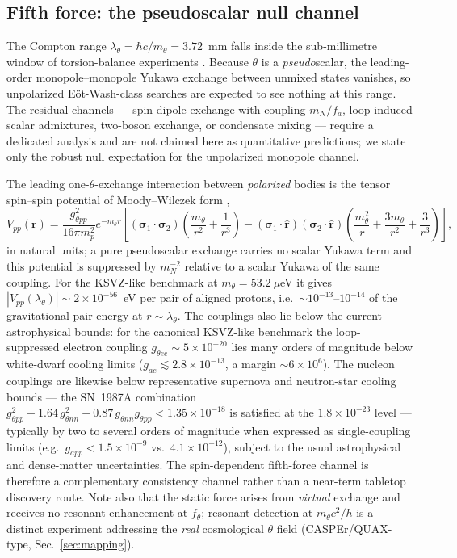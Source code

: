 \documentclass[11pt,a4paper]{article}
\begin{document}
\subsection{Fifth force: the pseudoscalar null channel}

The Compton range $\lambda_\theta = \hbar c/m_\theta = 3.72$~mm falls inside
the sub-millimetre window of torsion-balance experiments \cite{AxionReview}.
Because $\theta$ is a \emph{pseudo}scalar, the leading-order
monopole--monopole Yukawa exchange between unmixed states vanishes, so
unpolarized E\"ot-Wash-class searches are expected to see nothing at this
range. The residual channels --- spin-dipole exchange with coupling
$m_N/f_a$, loop-induced scalar admixtures, two-boson exchange, or
condensate mixing --- require a dedicated analysis and are not claimed here
as quantitative predictions; we state only the robust null expectation for
the unpolarized monopole channel.

The leading one-$\theta$-exchange interaction between \emph{polarized}
bodies is the tensor spin--spin potential of Moody--Wilczek form
\cite{MoodyWilczek},
\begin{equation}
V_{pp}(\mathbf r) = \frac{g_{\theta pp}^{2}}{16\pi m_p^{2}}
e^{-m_\theta r}
\left[
(\boldsymbol\sigma_1\cdot\boldsymbol\sigma_2)
\left(\frac{m_\theta}{r^2}+\frac{1}{r^3}\right)
-
(\boldsymbol\sigma_1\cdot\hat{\mathbf r})
(\boldsymbol\sigma_2\cdot\hat{\mathbf r})
\left(
\frac{m_\theta^2}{r}+\frac{3m_\theta}{r^2}+\frac{3}{r^3}\right)
\right],
\end{equation}
in natural units; a pure pseudoscalar exchange carries no scalar Yukawa
term and this potential is suppressed by $m_N^{-2}$ relative to a scalar
Yukawa of the same coupling. For the KSVZ-like benchmark at
$m_\theta = 53.2~\mu$eV it gives
$|V_{pp}(\lambda_\theta)| \sim 2\times 10^{-56}$~eV per pair of aligned
protons, i.e.\ $\sim 10^{-13}$--$10^{-14}$ of the gravitational pair
energy at $r\sim\lambda_\theta$. The couplings also lie below the current
astrophysical bounds: for the canonical KSVZ-like benchmark the
loop-suppressed electron coupling $g_{\theta ee} \sim 5\times 10^{-20}$
lies many orders of magnitude below white-dwarf cooling limits
($g_{ae} \lesssim 2.8\times 10^{-13}$, a margin $\sim 6\times 10^{6}$).
The nucleon couplings are likewise below representative supernova and
neutron-star cooling bounds --- the SN~1987A combination
$g_{\theta pp}^{2} + 1.64\,g_{\theta nn}^{2} +
0.87\,g_{\theta nn}g_{\theta pp} < 1.35\times 10^{-18}$ \cite{AstroBounds}
is satisfied at the $1.8\times 10^{-23}$ level --- typically by two to
several orders of magnitude when expressed as single-coupling limits
(e.g.\ $g_{app} < 1.5\times 10^{-9}$ vs.\ $4.1\times 10^{-12}$), subject
to the usual astrophysical and dense-matter uncertainties. The
spin-dependent fifth-force channel is
therefore a complementary consistency channel rather than a near-term
tabletop discovery route. Note also that the static force arises from
\emph{virtual} exchange and receives no resonant enhancement at
$f_\theta$; resonant detection at $m_\theta c^2/h$ is a distinct
experiment addressing the \emph{real} cosmological $\theta$ field
(CASPEr/QUAX-type, Sec.~\ref{sec:mapping}).
\end{document}
